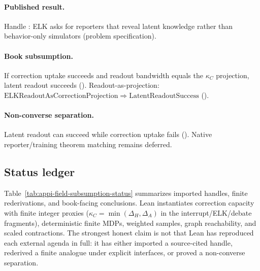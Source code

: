 \paragraph{Published result.}
Handle : ELK asks for reporters that reveal latent knowledge rather than behavior-only simulators \autocite{christiano2021elk} (problem specification).

\paragraph{Book subsumption.}
If correction uptake succeeds and readout bandwidth equals the \(\kappa_C\) projection, latent readout succeeds ().
Readout-as-projection: \(\mathrm{ELKReadoutAsCorrectionProjection}\Rightarrow\mathrm{LatentReadoutSuccess}\) ().

\paragraph{Non-converse separation.}
Latent readout can succeed while correction uptake fails ().
Native reporter/training theorem matching remains deferred.

\subsection{Status ledger}
\label{sec:appi-book-field-subsumptions}

Table~\ref{tab:appi-field-subsumption-status} summarizes imported handles, finite rederivations, and book-facing conclusions.
Lean instantiates correction capacity with finite integer proxies (\(\kappa_C=\min(\Delta_H,\Delta_A)\) in the interrupt/ELK/debate fragments), deterministic finite MDPs, weighted samples, graph reachability, and scaled contractions.
The strongest honest claim is not that Lean has reproduced each external agenda in full: it has either imported a source-cited handle, rederived a finite analogue under explicit interfaces, or proved a non-converse separation.

